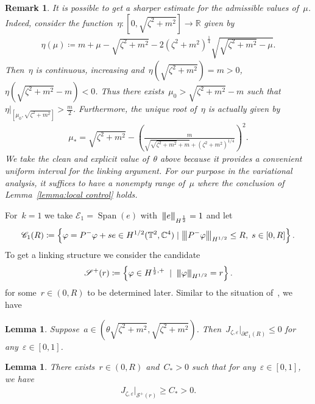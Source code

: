 \documentclass[10pt,a4paper]{amsart}
\newcommand{\tnorm}[1]{%
  \left\vert\kern-0.3ex\left\vert\kern-0.3ex\left\vert #1 \right\vert\kern-0.3ex\right\vert\kern-0.3ex\right\vert
}
\newcommand{\p}{\partial}
\newcommand{\R}{\mathbb{R}}
\newcommand{\C}{\mathbb{C}}
\newcommand{\T}{\mathbb{T}}
\newcommand{\eps}{\varepsilon}
\newcommand{\parenthesis}[1]{\left(#1\right)} %
\newcommand{\braces}[1]{\left\{#1\right\}} %
\DeclareMathOperator{\Span}{Span}
\newtheorem{lemma}[thm]{Lemma}
\newtheorem{rmk}[thm]{Remark}
\begin{document}
\begin{rmk}
    It is possible to get a sharper estimate for the admissible values of~$\mu$.
    Indeed, consider the function~$\eta\colon [0,\sqrt{\zeta^2+m^2}]\to\R$ given by
    \begin{align}
    \eta(\mu)\coloneqq m+\mu-\sqrt{\zeta^2+m^2} -2(\zeta^2+m^2)^{\frac{1}{4}}\sqrt{\sqrt{ \zeta^2+m^2 }  -\mu}.
    \end{align}
    Then~$\eta$ is continuous, increasing and~$\eta(\sqrt{\zeta^2+m^2})=m>0$,~$\eta(\sqrt{\zeta^2+m^2}-m)<0$.
    Thus there exists~$\mu_0> \sqrt{\zeta^2+m^2}-m $ such that~$\eta|_{[\mu_0,\sqrt{\zeta^2+m^2}]}>\frac{m}{2}$.
    Furthermore, the unique root of~$\eta$ is actually given by
    \begin{align}
        \mu_*=\sqrt{\zeta^2+m^2}-\parenthesis{\frac{m}{\sqrt{\sqrt{\zeta^2+m^2}+m}+ (\zeta^2+m^2)^{1/4} } }^2.
    \end{align}
    We take the clean and explicit value of~$\theta$ above because it provides a convenient uniform interval for the linking argument.
    For our purpose in the variational analysis, it suffices to have a nonempty range of~$\mu$ where the conclusion of Lemma~\ref{lemma:local control} holds. 
    

    
\end{rmk}


For~$k=1$ we take $\mathscr{E}_1=\Span(e)$ with~$\tnorm{e}_{H^{\frac{1}{2}}}=1$ and let
\begin{align}
    \mathscr{C}_1(R)
    \coloneqq \braces{\varphi= P^-\varphi + s e\in H^{1/2}(\T^2,\C^4) \mid  \tnorm{P^-\varphi}_{H^{1/2}}\leq R, \; s \in [0, R]}.
\end{align}
To get a linking structure we consider the candidate
\begin{align}
    \mathscr{S}^+(r)\coloneqq \braces{\varphi\in H^{\frac{1}{2},+} \; \mid \; \tnorm{\varphi}_{H^{1/2}}=r }.
\end{align}
for some~$r\in(0,R)$ to be determined later.
Similar to the situation of~\cite{WZ2026Stationary}, we have
\begin{lemma}\label{lemma:negativity on boundary-1}
    Suppose~$a \in (\theta\sqrt{\zeta^2+m^2},\sqrt{\zeta^2+m^2})$. 
    Then~$J_{\zeta,\eps}|_{\p\mathscr{C}_1(R)}\leq 0$ for any~$\eps\in [0,1]$.
\end{lemma}
\begin{lemma}\label{lemma:positivity in interior-1}
    There exists~$r\in (0,R)$ and~$C_*>0$ such that for any~$\eps\in [0,1]$, we have
    \begin{align}
         J_{\zeta,\eps}|_{\mathscr{S}^+(r)}\geq C_*>0.
    \end{align}
\end{lemma}
\end{document}
